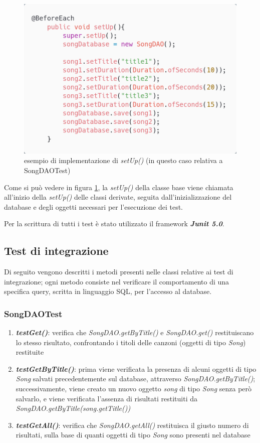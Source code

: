 \documentclass{article}
\begin{document}
  \begin{figure}[H]
    \centering
    \includegraphics[width=0.5\linewidth]{setUp.png}
    \caption{esempio di implementazione di \textit{setUp()} (in questo caso relativa a SongDAOTest)}
    \label{fig:setUp}
  \end{figure}


  Come si può vedere in figura \ref{fig:setUp}, la \textit{setUp()} della classe base viene chiamata all'inizio della \textit{setUp()} delle classi
  derivate, seguita dall'inizializzazione del database e degli oggetti necessari per l'esecuzione dei test.

  Per la scrittura di tutti i test è stato utilizzato il framework \textbf{\textit{Junit 5.0}}.

  \subsection{Test di integrazione}
  Di seguito vengono descritti i metodi presenti nelle classi relative ai test di integrazione; ogni metodo consiste nel verificare il comportamento di una specifica query, scritta in linguaggio SQL, per l'accesso al database.


  \subsubsection{SongDAOTest}
  \begin{enumerate}

    \item \textbf{\textit{testGet()}}: verifica che \textit{SongDAO.getByTitle()} e \textit{SongDAO.get()} restituiscano lo stesso risultato, confrontando i titoli delle canzoni (oggetti di tipo \textit{Song}) restituite

    \item \textbf{\textit{testGetByTitle()}}: prima viene verificata la presenza di alcuni oggetti di tipo \textit{Song} salvati precedentemente sul database, attraverso \textit{SongDAO.getByTitle()}; successivamente, viene creato un nuovo oggetto \textit{song} di tipo \textit{Song} senza però salvarlo, e viene verificata l'assenza di risultati restituiti da \textit{SongDAO.getByTitle(song.getTitle())}

    \item \textbf{\textit{testGetAll()}}: verifica che \textit{SongDAO.getAll()} restituisca il giusto numero di risultati, sulla base di quanti oggetti di tipo \textit{Song} sono presenti nel database

  \end{enumerate}
\end{document}
